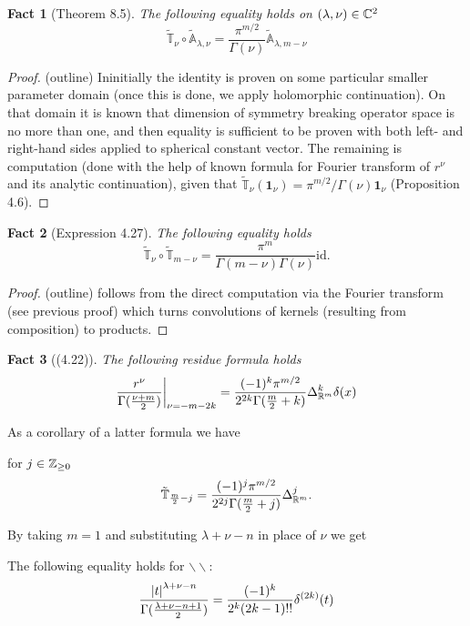 \documentclass[a4paper,landscape,12pt]{article}
\newcommand{\on}{\mathbf{1}_\nu}
\newtheorem{myfac}{Fact}
\begin{document}
\begin{myfac}[Theorem 8.5] The following equality holds on $(\lambda,\nu)\in\mathbb{C}^2$
	$$ \tilde{\mathbb{T}}_\nu\circ\tilde{\mathbb{A}}_{\lambda,\nu}=\frac{\pi^{m/2}}{\Gamma(\nu)}\tilde{\mathbb{A}}_{\lambda,
	m-\nu}$$
\end{myfac}
\begin{proof}(outline) Ininitially the identity is proven on some particular smaller parameter domain (once this is done, 
	we apply holomorphic continuation). On that domain it is known that dimension of symmetry breaking operator
	space is no more than one, and then equality is sufficient to be proven with both left- and right-hand sides applied
	to spherical constant vector. The remaining is computation (done with the 
	help of known formula for Fourier transform of $r^\nu$ and its
	analytic continuation), given that $\tilde{\mathbb{T}}_\nu(\mathbf{1}_\nu)=
	\pi^{m/2}/\Gamma(\nu)\on$ (Proposition 4.6).
\end{proof}
\begin{myfac}[Expression 4.27] The following equality holds
	$$ \tilde{\mathbb{T}}_\nu\circ\tilde{\mathbb{T}}_{m-\nu}=\frac{\pi^m}{\Gamma(m-\nu)\Gamma(\nu)}\mbox{id}. $$
\end{myfac}
\begin{proof}(outline) follows from the direct computation via the Fourier transform (see previous proof) which turns
	convolutions of kernels (resulting from composition) to products.
\end{proof}
\begin{myfac}[(4.22)] The following residue formula holds
	$$\frac{r^\nu}{\Gamma(\frac{\nu+m}{2})}\bigg|_{\nu=-m-2k}=\frac{(-1)^k\pi^{m/2}}{2^{2k}\Gamma(\frac{m}{2}+k)}\Delta^k_{\mathbb{R}^m}
	\delta(x)$$
\end{myfac}
As a corollary of a latter formula we have 
\begin{mycor}
for $j\in\mathbb{Z}_{\geq0}$
$$\tilde{\mathbb{T}}_{\frac{m}{2}-j}=\frac{(-1)^j\pi^{m/2}}{2^{2j}\Gamma(\frac{m}{2}+j)}\Delta^j_{\mathbb{R}^m}.$$
\end{mycor}
By taking $m=1$ and substituting $\lambda+\nu-n$ in place of $\nu$ we get
\begin{mycor}
The following equality holds for $\backslash\backslash$: 
		$$\frac{\left|t\right|^{\lambda+\nu-n}}{\Gamma(\frac{\lambda+\nu-n+1}{2})}=\frac{(-1)^k}{2^k(2k-1)!!}\delta^{(2k)}(t)$$
\end{mycor}
\end{document}
